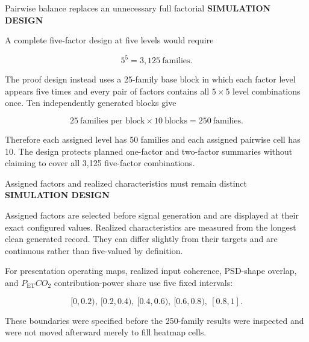 \documentclass[aspectratio=169,11pt]{beamer}
\newcommand{\PETCOtwo}{P_{\mathrm{ET}}CO_2}
\newcommand{\sectionlabel}[1]{%
  {\color{Accent}\fontsize{8}{9.5}\selectfont\bfseries\MakeUppercase{#1}}\par\vspace{0.12cm}}
\begin{document}
\begin{frame}{Pairwise balance replaces an unnecessary full factorial}
\sectionlabel{Simulation Design}
A complete five-factor design at five levels would require

\[
5^5=3{,}125\ \text{families}.
\]

The proof design instead uses a 25-family base block in which each factor level
appears five times and every pair of factors contains all $5\times5$ level
combinations once. Ten independently generated blocks give

\[
25\ \text{families per block}\times10\ \text{blocks}=250\ \text{families}.
\]

Therefore each assigned level has 50 families and each assigned pairwise cell
has 10. The design protects planned one-factor and two-factor summaries without
claiming to cover all 3,125 five-factor combinations.
\end{frame}

\begin{frame}{Assigned factors and realized characteristics must remain distinct}
\sectionlabel{Simulation Design}
Assigned factors are selected before signal generation and are displayed at
their exact configured values. Realized characteristics are measured from the
longest clean generated record. They can differ slightly from their targets and
are continuous rather than five-valued by definition.

\vspace{0.35cm}
For presentation operating maps, realized input coherence, PSD-shape overlap,
and $\PETCOtwo$ contribution-power share use five fixed intervals:

\[
[0,0.2),\ [0.2,0.4),\ [0.4,0.6),\ [0.6,0.8),\ [0.8,1].
\]

These boundaries were specified before the 250-family results were inspected
and were not moved afterward merely to fill heatmap cells.
\end{frame}
\end{document}
